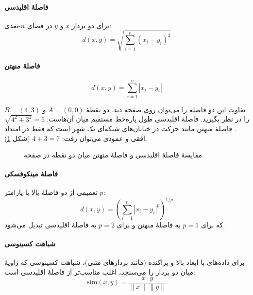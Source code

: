\paragraph{فاصلهٔ اقلیدسی}
برای دو بردار $x$ و $y$ در فضای $n$-بعدی:
\[
d(x, y) = \sqrt{\sum_{i=1}^{n} (x_i - y_i)^2}
\]

\paragraph{فاصلهٔ منهتن}
\[
d(x, y) = \sum_{i=1}^{n} |x_i - y_i|
\]

تفاوت این دو فاصله را می‌توان روی صفحه دید. دو نقطهٔ $A=(0,0)$ و $B=(4,3)$ را
در نظر بگیرید. فاصلهٔ اقلیدسی طول پاره‌خط مستقیم میان آن‌هاست:
$\sqrt{4^2+3^2}=5$. فاصلهٔ منهتن مانند حرکت در خیابان‌های شبکه‌ای یک شهر است
که فقط در امتداد افقی و عمودی می‌توان رفت: $4+3=7$ (شکل \ref{fig:distances}).

\begin{figure}[htbp]
\centering
{}
\caption{مقایسهٔ فاصلهٔ اقلیدسی و فاصلهٔ منهتن میان دو نقطه در صفحه}
\label{fig:distances}
\end{figure}

\paragraph{فاصلهٔ مینکوفسکی}
تعمیمی از دو فاصلهٔ بالا با پارامتر $p$:
\[
d(x, y) = \left( \sum_{i=1}^{n} |x_i - y_i|^p \right)^{1/p}
\]
که برای $p=1$ به فاصلهٔ منهتن و برای $p=2$ به فاصلهٔ اقلیدسی تبدیل می‌شود.

\paragraph{شباهت کسینوسی}
برای داده‌های با ابعاد بالا و پراکنده (مانند بردارهای متنی)، شباهت کسینوسی
که زاویهٔ میان دو بردار را می‌سنجد، اغلب مناسب‌تر از فاصلهٔ اقلیدسی است:
\[
\text{sim}(x, y) = \frac{x \cdot y}{\|x\| \, \|y\|}
\]

